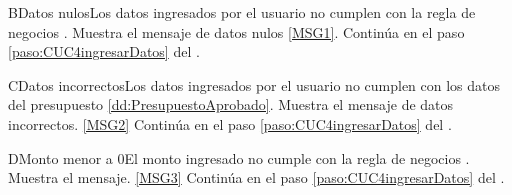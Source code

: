 	\begin{UCtrayectoriaA}{B}{Datos nulos}{Los datos ingresados por el usuario  no cumplen con la regla de negocios .}
			\UCpaso Muestra el mensaje de datos nulos \ref{MSG1}.
			\UCpaso Continúa en el paso \ref{paso:CUC4ingresarDatos} del .
	\end{UCtrayectoriaA}
	\begin{UCtrayectoriaA}{C}{Datos incorrectos}{Los datos ingresados por el usuario  no cumplen con los datos del presupuesto \ref{dd:PresupuestoAprobado}.}
			\UCpaso Muestra el mensaje de datos incorrectos. \ref{MSG2}
			\UCpaso Continúa en el paso \ref{paso:CUC4ingresarDatos} del .
	\end{UCtrayectoriaA}

	\begin{UCtrayectoriaA}{D}{Monto menor a 0}{El monto ingresado no cumple con la regla de negocios .}
		\UCpaso Muestra el mensaje. \ref{MSG3}
		\UCpaso Continúa en el paso \ref{paso:CUC4ingresarDatos} del .
	\end{UCtrayectoriaA}

